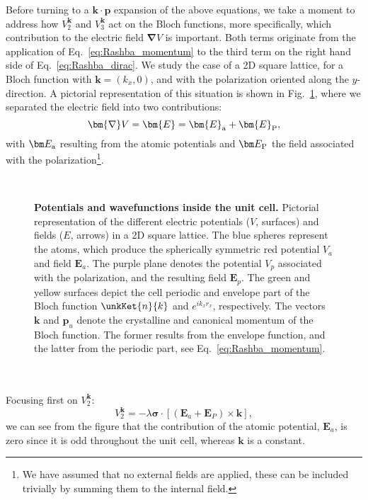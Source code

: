 Before turning to a $\bm{k} \cdot \bm{p}$ expansion of the above equations, we take a moment to address how $V^{\bm k}_2$ and $V^{\bm k}_3$ act on the Bloch functions, more specifically, which contribution to the electric field $\bm{\nabla}V$ is important.
Both terms originate from the application of Eq.~\eqref{eq:Rashba_momentum} to the third term on the right hand side of Eq.~\eqref{eq:Rashba_dirac}.
We study the case of a 2D square lattice, for a Bloch function with $\bm k = (k_x, 0)$, and with the polarization oriented along the $y$-direction.
A pictorial representation of this situation is shown in Fig.~\ref{fig:Efield_cell_drawing}, where we separated the electric field into two contributions:
\begin{equation}
	\bm{\nabla} V = \bm{E} = \bm{E}_{\rm a} + \bm{E}_{\rm P},
\end{equation}
with $\bm E_{\rm a}$ resulting from the atomic potentials and $\bm E_{\rm P}$ the field associated with the polarization\footnote{We have assumed that no external fields are applied, these can be included trivially by summing them to the internal field.}.
\begin{figure}[h]
~\centering
{}\caption{\label{fig:Efield_cell_drawing}{\bf Potentials and wavefunctions inside the unit cell.} Pictorial representation of the different electric potentials ($V$, surfaces) and fields ($E$, arrows) in a 2D square lattice. The blue spheres represent the atoms, which produce the spherically symmetric red potential $V_a$ and field $\bm E_a$. The purple plane denotes the potential $V_p$ associated with the polarization, and the resulting field $\bm E_p$. The green and yellow surfaces depict the cell periodic and envelope part of the Bloch function $\unkKet{n}{k}$ and $e^{ik_x r_x}$, respectively. The vectors $\bm k$ and $\bm p_u$ denote the crystalline and canonical momentum of the Bloch function.
The former results from the envelope function, and the latter from the periodic part, see Eq.~\eqref{eq:Rashba_momentum}.}
\end{figure}
\\\\
Focusing first on $V^{\bm k}_2$:
\begin{equation}
	\label{eq:Rashba_purerel}
	V^{\bm k}_2 = -\lambda \bm{\sigma} \cdot \left[ (\bm E_a + \bm E_P) \times \bm{k}\right],
\end{equation}
we can see from the figure that the contribution of the atomic potential, $\bm E_a$, is zero since it is odd throughout the unit cell, whereas $\bm k$ is a constant.
